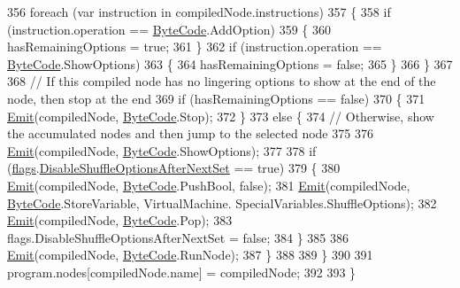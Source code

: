 \begin{DoxyCode}
356                 \textcolor{keywordflow}{foreach} (var instruction \textcolor{keywordflow}{in} compiledNode.instructions)
357                 \{
358                     \textcolor{keywordflow}{if} (instruction.operation == \hyperlink{a00031_ad5dfb6ee68ca7469623ad3e459f98894}{ByteCode}.AddOption)
359                     \{
360                         hasRemainingOptions = \textcolor{keyword}{true};
361                     \}
362                     \textcolor{keywordflow}{if} (instruction.operation == \hyperlink{a00031_ad5dfb6ee68ca7469623ad3e459f98894}{ByteCode}.ShowOptions)
363                     \{
364                         hasRemainingOptions = \textcolor{keyword}{false};
365                     \}
366                 \}
367 
368                 \textcolor{comment}{// If this compiled node has no lingering options to show at the end of the node, then stop
       at the end}
369                 \textcolor{keywordflow}{if} (hasRemainingOptions == \textcolor{keyword}{false})
370                 \{
371                     \hyperlink{a00034_a774e8c143cdda0584fcfdda98626a83c}{Emit}(compiledNode, \hyperlink{a00031_ad5dfb6ee68ca7469623ad3e459f98894}{ByteCode}.Stop);
372                 \}
373                 \textcolor{keywordflow}{else} \{
374                     \textcolor{comment}{// Otherwise, show the accumulated nodes and then jump to the selected node}
375 
376                     \hyperlink{a00034_a774e8c143cdda0584fcfdda98626a83c}{Emit}(compiledNode, \hyperlink{a00031_ad5dfb6ee68ca7469623ad3e459f98894}{ByteCode}.ShowOptions);
377 
378                     \textcolor{keywordflow}{if} (\hyperlink{a00034_a541022d89bcf9bc8f794eb6d6b438d08}{flags}.\hyperlink{a00034_a8b49bb7763ff477cba21d7c771ef3ed0}{DisableShuffleOptionsAfterNextSet} == \textcolor{keyword}{
      true})
379                     \{
380                         \hyperlink{a00034_a774e8c143cdda0584fcfdda98626a83c}{Emit}(compiledNode, \hyperlink{a00031_ad5dfb6ee68ca7469623ad3e459f98894}{ByteCode}.PushBool, \textcolor{keyword}{false});
381                         \hyperlink{a00034_a774e8c143cdda0584fcfdda98626a83c}{Emit}(compiledNode, \hyperlink{a00031_ad5dfb6ee68ca7469623ad3e459f98894}{ByteCode}.StoreVariable, VirtualMachine.
      SpecialVariables.ShuffleOptions);
382                         \hyperlink{a00034_a774e8c143cdda0584fcfdda98626a83c}{Emit}(compiledNode, \hyperlink{a00031_ad5dfb6ee68ca7469623ad3e459f98894}{ByteCode}.Pop);
383                         flags.DisableShuffleOptionsAfterNextSet = \textcolor{keyword}{false};
384                     \}
385 
386                     \hyperlink{a00034_a774e8c143cdda0584fcfdda98626a83c}{Emit}(compiledNode, \hyperlink{a00031_ad5dfb6ee68ca7469623ad3e459f98894}{ByteCode}.RunNode);
387                 \}
388 
389             \}
390 
391             program.nodes[compiledNode.name] = compiledNode;
392 
393         \}
\end{DoxyCode}

